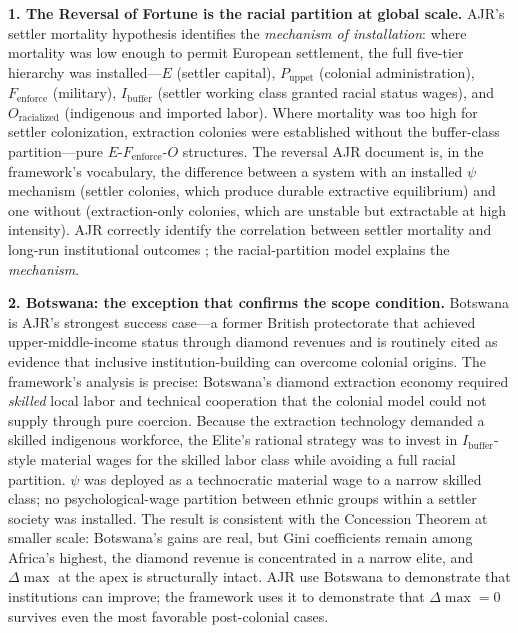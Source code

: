 \textbf{1. The Reversal of Fortune is the racial partition at global scale.} AJR's settler mortality hypothesis identifies the \textit{mechanism of installation}: where mortality was low enough to permit European settlement, the full five-tier hierarchy was installed---$E$ (settler capital), $P_{\text{uppet}}$ (colonial administration), $F_{\text{enforce}}$ (military), $I_{\text{buffer}}$ (settler working class granted racial status wages), and $O_{\text{racialized}}$ (indigenous and imported labor). Where mortality was too high for settler colonization, extraction colonies were established without the buffer-class partition---pure $E$-$F_{\text{enforce}}$-$O$ structures. The reversal AJR document is, in the framework's vocabulary, the difference between a system with an installed $\psi$ mechanism (settler colonies, which produce durable extractive equilibrium) and one without (extraction-only colonies, which are unstable but extractable at high intensity). AJR correctly identify the correlation between settler mortality and long-run institutional outcomes \cite{ajr_reversal}; the racial-partition model explains the \textit{mechanism}.

\textbf{2. Botswana: the exception that confirms the scope condition.} Botswana is AJR's strongest success case---a former British protectorate that achieved upper-middle-income status through diamond revenues and is routinely cited as evidence that inclusive institution-building can overcome colonial origins. The framework's analysis is precise: Botswana's diamond extraction economy required \textit{skilled} local labor and technical cooperation that the colonial model could not supply through pure coercion. Because the extraction technology demanded a skilled indigenous workforce, the Elite's rational strategy was to invest in $I_{\text{buffer}}$-style material wages for the skilled labor class while avoiding a full racial partition. $\psi$ was deployed as a technocratic material wage to a narrow skilled class; no psychological-wage partition between ethnic groups within a settler society was installed. The result is consistent with the Concession Theorem at smaller scale: Botswana's gains are real, but Gini coefficients remain among Africa's highest, the diamond revenue is concentrated in a narrow elite, and $\Delta\max$ at the apex is structurally intact. AJR use Botswana to demonstrate that institutions can improve; the framework uses it to demonstrate that $\Delta\max = 0$ survives even the most favorable post-colonial cases.

